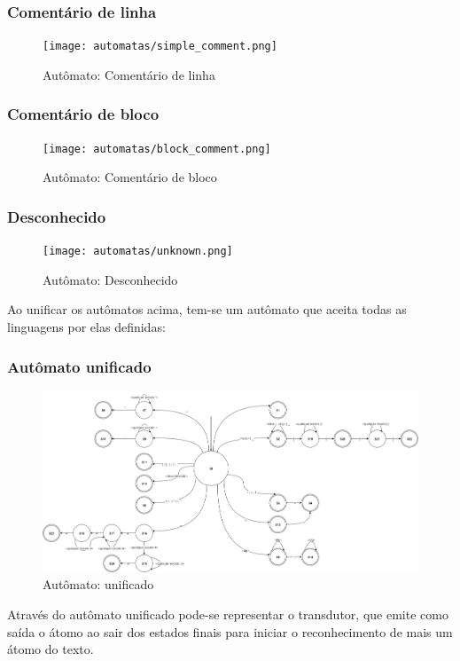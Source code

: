 \subsubsection{Comentário de linha}
\begin{figure}[H]
\texttt{[image: automatas/simple\_comment.png]}
\caption{\label{fig:simple_comment} Autômato: Comentário de linha}
\end{figure}

\subsubsection{Comentário de bloco}
\begin{figure}[H]
\texttt{[image: automatas/block\_comment.png]}
\caption{\label{fig:block_comment} Autômato: Comentário de bloco}
\end{figure}

\subsubsection{Desconhecido}
\begin{figure}[H]
\texttt{[image: automatas/unknown.png]}
\caption{\label{fig:unknown} Autômato: Desconhecido}
\end{figure}

Ao unificar os autômatos acima, tem-se um autômato que aceita todas as linguagens por elas definidas:

\subsubsection{Autômato unificado}
\begin{figure}[H]
\includegraphics[width=1\textwidth]{automatas/unificado.png}
\caption{\label{fig:unified} Autômato: unificado}
\end{figure}

Através do autômato unificado pode-se representar o transdutor, que emite como saída o átomo ao sair dos estados finais para iniciar o reconhecimento de mais um átomo do texto.

